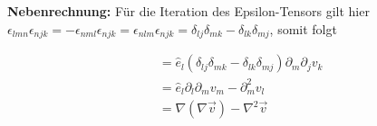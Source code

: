 \documentclass[a4paper,german,12pt,smallheadings]{scrartcl}
\begin{document}
\textbf{Nebenrechnung:} Für die Iteration des Epsilon-Tensors gilt hier $
  \epsilon_{lmn} \epsilon_{njk} = -\epsilon_{nml} \epsilon_{njk}
  = \epsilon_{nlm} \epsilon_{njk}
  = \delta_{lj}\delta_{mk} - \delta_{lk}\delta_{mj}
$, somit folgt

\begin{align}
  &= \hat{e}_l (\delta_{lj}\delta_{mk} - \delta_{lk}\delta_{mj}) \partial_m \partial_j v_k \\
  &= \hat{e}_l \partial_l \partial_m v_m - \partial_m^2 v_l \\
  &= \nabla(\nabla \vec{v}) - \nabla^2 \vec{v}
\end{align}
\end{document}
